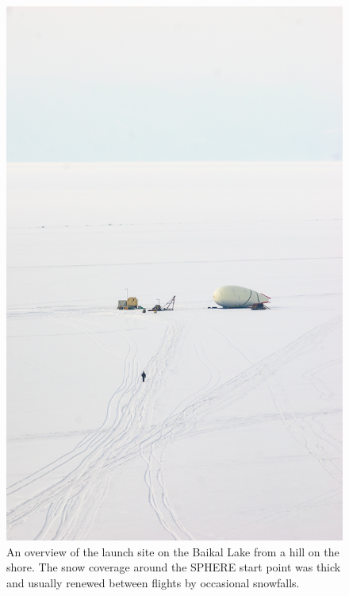 \documentclass[universe,article,submit,moreauthors,pdftex]{Definitions/mdpi}
\begin{document}
\begin{figure}[tb]
    \begin{minipage}[t]{0.40\textwidth}
        \centering
        \includegraphics[trim=1cm 5cm 0cm 5cm,clip,width=\textwidth]{DSC_4049.jpg}\hspace{2pc}%
        \caption{An overview of the launch site on the Baikal Lake from a hill on the shore. The snow coverage around the SPHERE start point was thick and usually renewed between flights by occasional snowfalls.}
        \label{fig:baikal_snow}
    \end{minipage}
    \hfill
    \begin{minipage}[t]{0.58\textwidth}

\end{minipage}
\end{figure}
\end{document}
